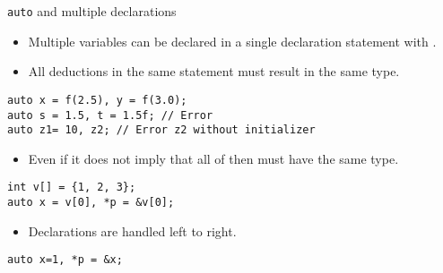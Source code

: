 \begin{frame}[fragile]{\texttt{auto} and multiple declarations}
\begin{itemize}
  \item Multiple variables can be declared in a single declaration statement with .
  \item All deductions in the same statement must result in the same type.
\end{itemize}
\begin{lstlisting}
auto x = f(2.5), y = f(3.0);
auto s = 1.5, t = 1.5f; // Error
auto z1= 10, z2; // Error z2 without initializer
\end{lstlisting}
\begin{itemize}

  \item Even if it does not imply that all of then must have the same type.
\end{itemize}
\begin{lstlisting}
int v[] = {1, 2, 3};
auto x = v[0], *p = &v[0];
\end{lstlisting}
\begin{itemize}
  \item Declarations are handled left to right.
\end{itemize}
\begin{lstlisting}
auto x=1, *p = &x;
\end{lstlisting}
\end{frame}

